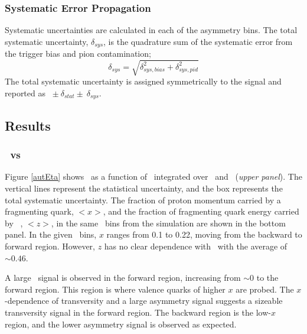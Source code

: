 \subsubsection{Systematic Error Propagation}
Systematic uncertainties are calculated in each of the asymmetry bins. The total systematic uncertainty, $\delta_{sys}$, is the quadrature sum of the systematic error from the trigger bias and pion contamination; 
\begin{equation}
    \delta_{sys} = \sqrt{\delta_{sys,bias}^2 + \delta_{sys,pid}^2}
\end{equation}
The total systematic uncertainty is assigned symmetrically to the signal and reported as \aut\ $\pm  
\ \delta_{stat} \pm\  \delta_{sys} $.

\subsection{Results}

\subsubsection{\aut\ vs \etap}

Figure \ref{autEta} shows \aut\ as a function of \etap\, integrated over \minv\ and \ptp\ (\textit{upper panel}). The vertical lines represent the statistical uncertainty, and the box represents the total systematic uncertainty. The fraction of proton momentum carried by a fragmenting quark, $<x>$, and the fraction of fragmenting quark energy carried by \pip\ , $<z>$, in the same \etap\ bins from the simulation are shown in the bottom panel. In the given \etap\ bins, $x$ ranges from 0.1 to 0.22, moving from the backward to forward region. However, $z$ has no clear dependence with \etap\ with the average of $\sim 0.46$.

A large \aut\ signal is observed in the forward region, increasing from \etap$\sim0$ to the forward region. This region is where valence quarks of higher $x$ are probed. The $x$-dependence of transversity and a large asymmetry signal  suggests a sizeable transversity signal in the forward region. The backward region is the low-$x$ region, and the lower asymmetry signal is observed as expected.  

